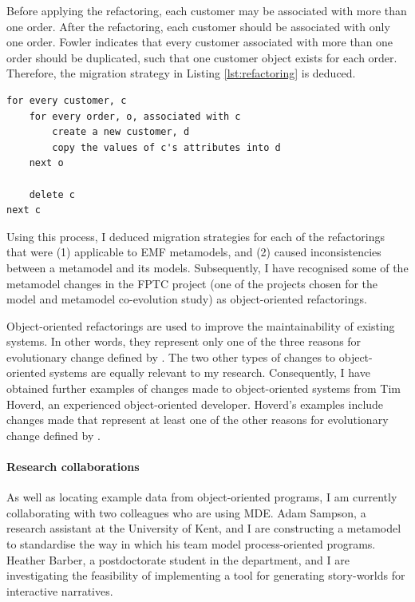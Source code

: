 Before applying the refactoring, each customer may be associated with more than one order. After the refactoring, each customer should be associated with only one order. Fowler indicates that every customer associated with more than one order should be duplicated, such that one customer object exists for each order. Therefore, the migration strategy in Listing \ref{lst:refactoring} is deduced.

\begin{lstlisting}[caption=Migration strategy for the refactoring in pseudo code., label=lst:refactoring]
for every customer, c
	for every order, o, associated with c
		create a new customer, d
		copy the values of c's attributes into d
	next o
	
	delete c
next c
\end{lstlisting}

Using this process, I deduced migration strategies for each of the refactorings that were (1) applicable to EMF metamodels, and (2) caused inconsistencies between a metamodel and its models. Subsequently, I have recognised some of the metamodel changes in the FPTC project (one of the projects chosen for the model and metamodel co-evolution study) as object-oriented refactorings.

Object-oriented refactorings are used to improve the maintainability of existing systems. In other words, they represent only one of the three reasons for evolutionary change defined by \cite{sjoberg93quantifying}. The two other types of changes to object-oriented systems are equally relevant to my research. Consequently, I have obtained further examples of changes made to object-oriented systems from Tim Hoverd, an experienced object-oriented developer. Hoverd's examples include changes made that represent at least one of the other reasons for evolutionary change defined by \cite{sjoberg93quantifying}.



\paragraph{Research collaborations} %
\label{par:collaborations}
As well as locating example data from object-oriented programs, I am currently collaborating with two colleagues who are using MDE. Adam Sampson, a research assistant at the University of Kent, and I are constructing a metamodel to standardise the way in which his team model process-oriented programs. Heather Barber, a postdoctorate student in the department, and I are investigating the feasibility of implementing a tool for generating story-worlds for interactive narratives.

